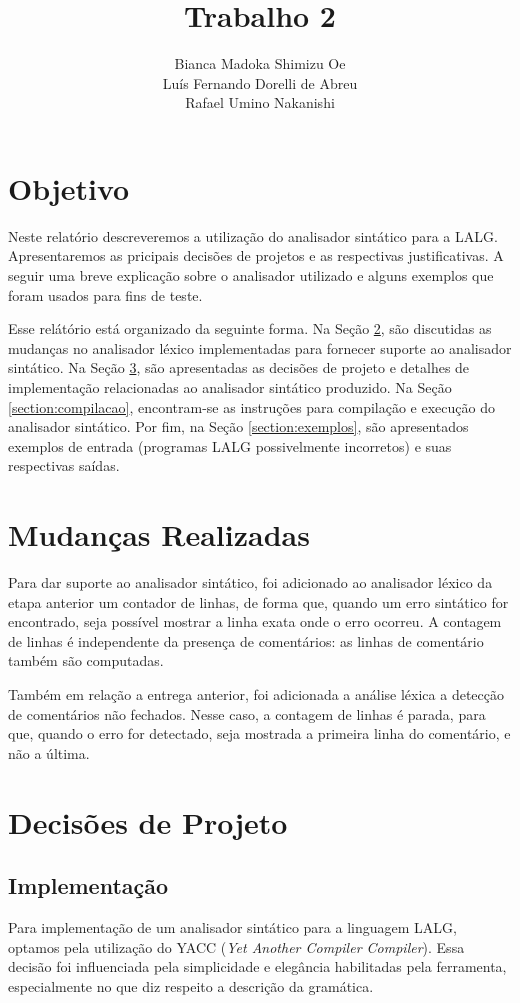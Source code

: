 \documentclass {article}
\title {Trabalho 2}
\author {Bianca Madoka Shimizu Oe \\ 
		Luís Fernando Dorelli de Abreu \\  
		Rafael Umino Nakanishi}
\begin{document}
\titlepage
\maketitle

\section{Objetivo}
	Neste relatório descreveremos a utilização do analisador sintático para a LALG. Apresentaremos as pricipais decisões de projetos e as respectivas justificativas. A seguir uma breve explicação sobre o analisador utilizado e alguns exemplos que foram usados para fins de teste.

	Esse relátório está organizado da seguinte forma. Na Seção \ref{section:lex}, são discutidas as mudanças no analisador léxico implementadas para fornecer suporte ao analisador sintático. Na Seção \ref{section:decisoes}, são apresentadas as decisões de projeto e detalhes de implementação relacionadas ao analisador sintático produzido. Na Seção \ref{section:compilacao}, encontram-se as instruções para compilação e execução do analisador sintático. Por fim, na Seção \ref{section:exemplos}, são apresentados exemplos de entrada (programas LALG possivelmente incorretos) e suas respectivas saídas.

\section{Mudanças Realizadas}\label{section:lex}

	Para dar suporte ao analisador sintático, foi adicionado ao analisador léxico da etapa anterior um contador de linhas, de forma que, quando um erro sintático for encontrado, seja possível mostrar a linha exata onde o erro ocorreu. A contagem de linhas é independente da presença de comentários: as linhas de comentário também são computadas.

	Também em relação a entrega anterior, foi adicionada a análise léxica a detecção de comentários não fechados. Nesse caso, a contagem de linhas é parada, para que, quando o erro for detectado, seja mostrada a primeira linha do comentário, e não a última. 

\section{Decisões de Projeto}\label{section:decisoes}
	\subsection{Implementação}
		Para implementação de um analisador sintático para a linguagem LALG, optamos pela utilização do YACC (\emph{Yet Another Compiler Compiler}). Essa decisão foi influenciada pela simplicidade e elegância habilitadas pela ferramenta, especialmente no que diz respeito a descrição da gramática.  
\end{document}
